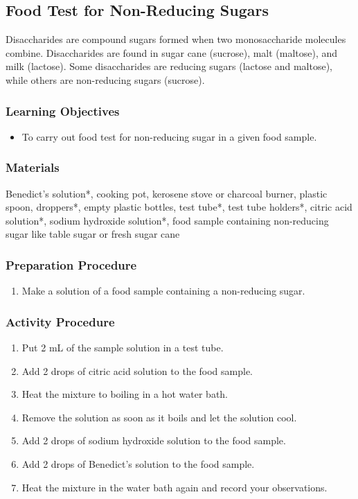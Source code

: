 \subsection{Food Test for Non-Reducing Sugars}
Disaccharides are compound sugars formed when two monosaccharide molecules combine. Disaccharides are found in sugar cane (sucrose), malt (maltose), and milk (lactose). Some disaccharides are reducing sugars (lactose and maltose), while others are non-reducing sugars (sucrose).

\subsubsection*{Learning Objectives}
\begin{itemize}
\item{To carry out food test for non-reducing sugar in a given food sample.}
\end{itemize}

\subsubsection*{Materials}
Benedict's solution*, cooking pot, kerosene stove or charcoal burner, plastic spoon, droppers*, empty plastic bottles, test tube*, test tube holders*, citric acid solution*, sodium hydroxide solution*, food sample containing non-reducing sugar like table sugar or fresh sugar cane

\subsubsection*{Preparation Procedure}
\begin{enumerate}
\item{Make a solution of a food sample containing a non-reducing sugar.}
\end{enumerate}

\subsubsection*{Activity Procedure}
\begin{enumerate}
\item{Put 2 mL of the sample solution in a test tube.}
\item{Add 2 drops of citric acid solution to the food sample.}
\item{Heat the mixture to boiling in a hot water bath.}
\item{Remove the solution as soon as it boils and let the solution cool.}
\item{Add 2 drops of sodium hydroxide solution to the food sample.}
\item{Add 2 drops of Benedict's solution to the food sample.}
\item{Heat the mixture in the water bath again and record your observations.}
\end{enumerate}

